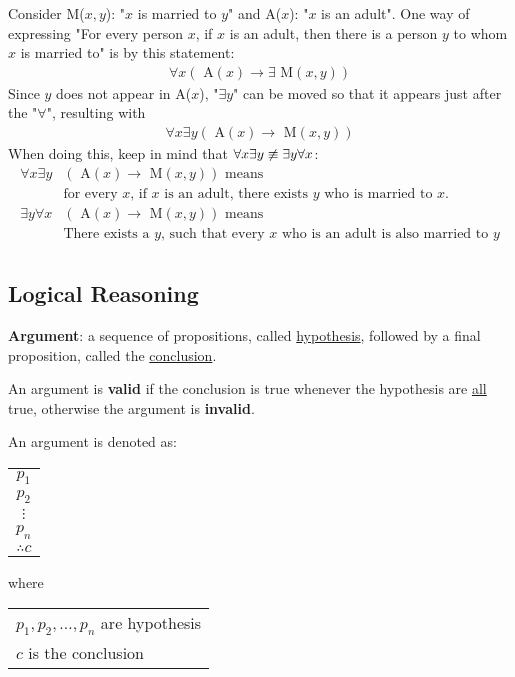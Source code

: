 \documentclass{article}
\begin{document}
Consider M($x, y$): "$x$ is married to $y$" and A($x$): "$x$ is an adult".
One way of expressing "For every person $x$, if $x$ is an adult, then
there is a person $y$ to whom $x$ is married to" is by this statement:
\begin{align*}
  \forall x (\text{ A}(x) \rightarrow \exists \text{ M}(x, y))
\end{align*}
Since $y$ does not appear in A($x$), "\(\exists y\)" can be moved so that it appears
just after the "\(\forall\)", resulting with
\begin{align*}
  \forall x \exists y (\text{ A}(x) \rightarrow \text{ M}(x, y))
\end{align*}
When doing this, keep in mind that \(\forall x \exists y \centernot \equiv \exists y \forall x\):
\begin{align*}
  \forall x \exists y & (\text{ A}(x) \rightarrow \text{ M}(x, y)) \text{ means}                              \\
                      & \text{for every $x$, if $x$ is an adult, there exists $y$ who is married to $x$.}     \\
  \exists y \forall x & (\text{ A}(x) \rightarrow \text{ M}(x, y)) \text{ means}                              \\
                      & \text{There exists a $y$, such that every $x$ who is an adult is also married to $y$} \\
\end{align*}

\subsection{Logical Reasoning}

\textbf{Argument}: a sequence of propositions, called \underline{hypothesis}, followed
by a final proposition, called the \underline{conclusion}.

An argument is \textbf{valid} if the conclusion is true whenever the hypothesis
are \underline{all} true, otherwise the argument is \textbf{invalid}.

\begin{center}
  An argument is denoted as:
  \begin{tabular}{c}
    \(p_1\)     \\
    \(p_2\)     \\
    \(\vdots \) \\
    \(p_n\)     \\
    \hline
    \(\therefore c\)
  \end{tabular}
  where
  \begin{tabular}{l}
    \(p_1, p_2, \ldots, p_n\) are hypothesis \\
    \(c\) is the conclusion
  \end{tabular}
\end{center}
\end{document}
